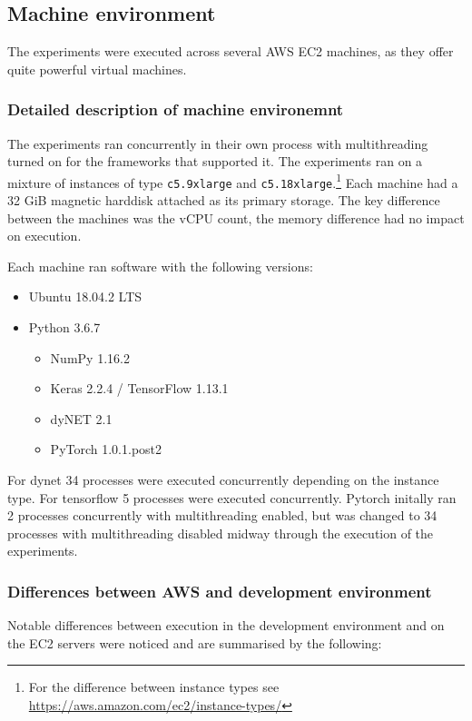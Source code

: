 \subsection{Machine environment}

The experiments were executed across several AWS EC2 machines, as they offer
quite powerful virtual machines.

\subsubsection{Detailed description of machine environemnt}

The experiments ran concurrently in their own process with multithreading
turned on for the frameworks that supported it. The experiments ran on a
mixture of instances of type \texttt{c5.9xlarge} and
\texttt{c5.18xlarge}.\footnote{For the difference between instance types see
\url{https://aws.amazon.com/ec2/instance-types/}}
Each machine had a 32 GiB magnetic harddisk attached as its primary storage.
The key difference between the machines was the vCPU count, the memory
difference had no impact on execution.

Each machine ran software with the following versions:
\begin{itemize}
  \item{Ubuntu 18.04.2 LTS}
  \item{Python 3.6.7}
  \begin{itemize}
    \item{NumPy 1.16.2}
    \item{Keras 2.2.4 / TensorFlow 1.13.1}
    \item{dyNET 2.1}
    \item{PyTorch 1.0.1.post2}
  \end{itemize}
\end{itemize}

For dynet 34 processes were executed concurrently depending on the
instance type.
For tensorflow 5 processes were executed concurrently.
Pytorch initally ran 2 processes concurrently with multithreading enabled, but
was changed to 34 processes with multithreading disabled midway through the
execution of the experiments.

\subsubsection{Differences between AWS and development environment}

Notable differences between execution in the development environment and on the
EC2 servers were noticed and are summarised by the following:

